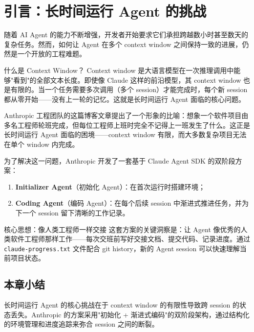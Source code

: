 \section{引言：长时间运行 Agent 的挑战}

随着 AI Agent 的能力不断增强，开发者开始要求它们承担跨越数小时甚至数天的复杂任务。然而，如何让 Agent 在多个 context window 之间保持一致的进展，仍然是一个开放的工程难题。

\begin{knowledgebox}{什么是 Context Window？}
Context window 是大语言模型在一次推理调用中能够"看到"的全部文本长度。即使像 Claude 这样的前沿模型，其 context window 也是有限的。当一个任务需要多次调用（多个 session）才能完成时，每个新 session 都从零开始——没有上一轮的记忆。这就是长时间运行 Agent 面临的核心问题。
\end{knowledgebox}

Anthropic 工程团队的这篇博客文章提出了一个形象的比喻：想象一个软件项目由多名工程师轮班完成，但每位工程师上班时完全不记得上一班发生了什么。这正是长时间运行 Agent 面临的困境——context window 有限，而大多数复杂项目无法在单个 window 内完成。

为了解决这一问题，Anthropic 开发了一套基于 Claude Agent SDK 的双阶段方案：
\begin{enumerate}
    \item \textbf{Initializer Agent}（初始化 Agent）：在首次运行时搭建环境；
    \item \textbf{Coding Agent}（编码 Agent）：在每个后续 session 中渐进式推进任务，并为下一个 session 留下清晰的工作记录。
\end{enumerate}

\begin{importantbox}{核心思想：像人类工程师一样交接}
这套方案的关键洞察是：让 Agent 像优秀的人类软件工程师那样工作——每次交班前写好交接文档、提交代码、记录进度。通过 \texttt{claude-progress.txt} 文件配合 git history，新的 Agent session 可以快速理解当前项目状态。
\end{importantbox}

\subsection{本章小结}

长时间运行 Agent 的核心挑战在于 context window 的有限性导致跨 session 的状态丢失。Anthropic 的方案采用"初始化 + 渐进式编码"的双阶段架构，通过结构化的环境管理和进度追踪来弥合 session 之间的断裂。


